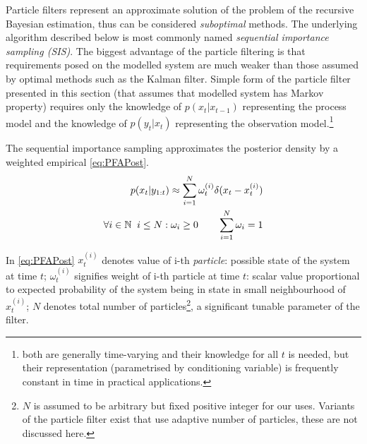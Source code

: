Particle filters represent an approximate solution of the problem of the recursive Bayesian
estimation,
thus can be considered \emph{suboptimal} methods. The underlying algorithm described below is most
commonly named \emph{sequential importance sampling (SIS)}. The biggest advantage of the particle filtering
is that requirements posed on the modelled system are much weaker than those assumed by optimal methods
such as the Kalman filter. Simple form of the particle filter presented in this section (that assumes that
modelled system has Markov property) requires only the knowledge of {\pdf} \(p(x_t|x_{t-1})\)
representing the process model and the knowledge of \(p(y_t|x_t)\) representing the observation
model.\footnote{both {\pdfs} are generally time-varying and their knowledge for all \(t\) is needed,
but their representation (parametrised by conditioning variable) is frequently constant in time in
practical applications.}

The sequential importance sampling approximates the posterior density by a weighted empirical
{\pdf} \eqref{eq:PFAPost}.
\begin{align}
	p(x_t | y_{1:t}) \approx \sum_{i=1}^N \omega_t^{(i)} \delta(x_t - x_t^{(i)}) \label{eq:PFAPost} \\
	\forall i \in \mathbb{N} \;\; i \leq N: \omega_i \geq 0 \quad\quad \sum_{i=1}^N \omega_i = 1 \notag
\end{align}

In \eqref{eq:PFAPost} \(x_t^{(i)}\) denotes value of i-th \emph{particle}: possible state of the
system at time \(t\);
\(\omega_t^{(i)}\) signifies weight of i-th particle at time \(t\): scalar value proportional to
expected probability of the system being in state in small neighbourhood of \(x_t^{(i)}\);
\(N\) denotes total number of particles\footnote{\(N\) is assumed to be
arbitrary but fixed positive integer for our uses. Variants of the particle filter exist that use
adaptive number of particles, these are not discussed here.}, a significant tunable parameter
of the filter.

